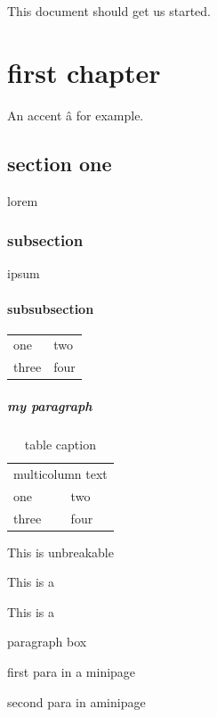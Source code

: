 \documentclass{book}
\begin{document}
This document should get us started.

\chapter{first chapter}

An accent \^a for example.

\section{section one}

\begin{center}
lorem
\end{center}

\subsection{subsection}

\begin{flushright}
ipsum
\end{flushright}

\subsubsection{subsubsection}

\begin{tabular}{ll}
one & two\\
three & four\\
\end{tabular}

\paragraph{my paragraph}

\begin{table}
\caption{table caption}\label{table:label}
\begin{tabular}{ll}
\multicolumn{2}{l}{multicolumn text}\\
one & two\\
three & four\\
\end{tabular}
\end{table}

This is \mbox{unbreakable}

This is a 

This is a \parbox{4in}{paragraph box}

\begin{minipage}{5in}
first para in a minipage

second para in a\linebreak minipage
\end{minipage}
\end{document}
